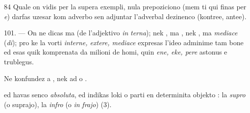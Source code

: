 \begin{VUpage}[88]{84}
Quale on vidis per la supera exempli, nula prepoziciono\nl
(mem ti qui finas per \textit{e}) darfas uzesar kom adverbo sen\nl
adjuntar l'adverbal dezinenco  (kontree, antee).

\VUblanc{3.58pt}%
101. --- On ne dicas  ma  (de l'adjektivo \textit{in}\cc
\textit{terna}); nek , ma , nek , ma \textit{mediace} (\textit{di}); pro\nl
ke la vorti \textit{interne, extere, mediace} expresas l'ideo adminime\nl
tam bone ed esas quik komprenata da milioni de homi, quin\nl
\textit{ene, eke, pere} astonus e trublegus.

Ne konfundez  a , nek  ad  o .

 ed  havas senco \textit{absoluta}, ed indikas loki o parti\nl
en determinita objekto : la \textit{supro} (o suprajo), la \textit{infro} (o \textit{in}\cc
\textit{frajo}) (3).
\end{VUpage}

